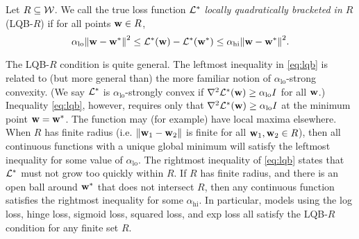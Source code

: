 \documentclass[thesis.tex]{subfiles}
\newcommand{\qhi}{\alpha_\text{hi}}
\newcommand{\qlo}{\alpha_\text{lo}}
\begin{document}
\begin{definition}
    Let $R\subseteq{\mathcal W}$.
    We call the true loss function $\mathcal{L}^*$ \emph{locally quadratically bracketed in $R$} (LQB-$R$) if for all points $\mathbf w\in R$,
\begin{equation}
    \label{eq:lqb}
\qlo\ltwo{\w-\wstar}^2 \le \Loss(\w) - \Loss(\wstar) \le \qhi\ltwo{\w-\wstar}^2
.
\end{equation}
\end{definition}
The LQB-$R$ condition is quite general.
The leftmost inequality in \eqref{eq:lqb} is related to (but more general than) the more familiar notion of $\qlo$-strong convexity.
(We say $\mathcal{L}^*$ is $\qlo$-strongly convex if $\nabla^2\Lossstar(\w) \ge \qlo I$ for all $\mathbf w$.)
Inequality \eqref{eq:lqb}, however, requires only that $\nabla^2\Lossstar(\w) \ge \qlo I$ at the minimum point $\mathbf w={\mathbf w^{*}}$.
The function may (for example) have local maxima elsewhere.
When $R$ has finite radius (i.e. ${\lVert {\mathbf w_1-\mathbf w_2} \rVert}$ is finite for all $\mathbf w_1,\mathbf w_2\in R$),
then all continuous functions with a unique global minimum will satisfy the leftmost inequality for some value of $\qlo$.
The rightmost inequality of \eqref{eq:lqb} states that $\mathcal{L}^*$ must not grow too quickly within $R$.
If $R$ has finite radius, and there is an open ball around ${\mathbf w^{*}}$ that does not intersect $R$,
then any continuous function satisfies the rightmost inequality for some $\qhi$.
In particular, models using the log loss, hinge loss, sigmoid loss, squared loss, and exp loss all satisfy the LQB-$R$ condition for any finite set $R$. 
\end{document}
